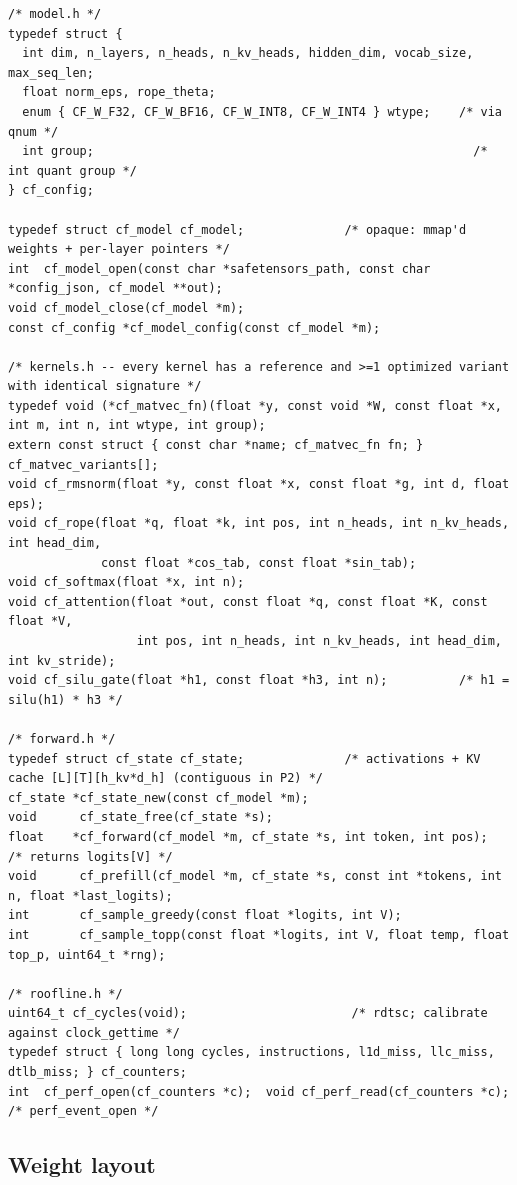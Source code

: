 \begin{lstlisting}[style=c]
/* model.h */
typedef struct {
  int dim, n_layers, n_heads, n_kv_heads, hidden_dim, vocab_size, max_seq_len;
  float norm_eps, rope_theta;
  enum { CF_W_F32, CF_W_BF16, CF_W_INT8, CF_W_INT4 } wtype;    /* via qnum */
  int group;                                                     /* int quant group */
} cf_config;

typedef struct cf_model cf_model;              /* opaque: mmap'd weights + per-layer pointers */
int  cf_model_open(const char *safetensors_path, const char *config_json, cf_model **out);
void cf_model_close(cf_model *m);
const cf_config *cf_model_config(const cf_model *m);

/* kernels.h -- every kernel has a reference and >=1 optimized variant with identical signature */
typedef void (*cf_matvec_fn)(float *y, const void *W, const float *x, int m, int n, int wtype, int group);
extern const struct { const char *name; cf_matvec_fn fn; } cf_matvec_variants[];
void cf_rmsnorm(float *y, const float *x, const float *g, int d, float eps);
void cf_rope(float *q, float *k, int pos, int n_heads, int n_kv_heads, int head_dim,
             const float *cos_tab, const float *sin_tab);
void cf_softmax(float *x, int n);
void cf_attention(float *out, const float *q, const float *K, const float *V,
                  int pos, int n_heads, int n_kv_heads, int head_dim, int kv_stride);
void cf_silu_gate(float *h1, const float *h3, int n);          /* h1 = silu(h1) * h3 */

/* forward.h */
typedef struct cf_state cf_state;              /* activations + KV cache [L][T][h_kv*d_h] (contiguous in P2) */
cf_state *cf_state_new(const cf_model *m);
void      cf_state_free(cf_state *s);
float    *cf_forward(cf_model *m, cf_state *s, int token, int pos);     /* returns logits[V] */
void      cf_prefill(cf_model *m, cf_state *s, const int *tokens, int n, float *last_logits);
int       cf_sample_greedy(const float *logits, int V);
int       cf_sample_topp(const float *logits, int V, float temp, float top_p, uint64_t *rng);

/* roofline.h */
uint64_t cf_cycles(void);                       /* rdtsc; calibrate against clock_gettime */
typedef struct { long long cycles, instructions, l1d_miss, llc_miss, dtlb_miss; } cf_counters;
int  cf_perf_open(cf_counters *c);  void cf_perf_read(cf_counters *c);   /* perf_event_open */
\end{lstlisting}

\subsection{Weight layout}

